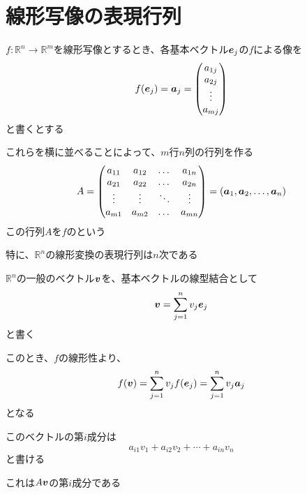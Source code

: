 \documentclass[b5paper,12pt]{jsarticle}
\begin{document}
\sectionline
\section{線形写像の表現行列}

$f\colon \mathbb{R}^n \to \mathbb{R}^m$を線形写像とするとき、各基本ベクトル$\vb*{e}_j$の$f$による像を
\begin{equation*}
  f(\vb*{e}_j) = \vb*{a}_j = \begin{pmatrix}
    a_{1j} \\
    a_{2j} \\
    \vdots \\
    a_{mj}
  \end{pmatrix}
\end{equation*}
と書くとする

これらを横に並べることによって、$m$行$n$列の行列を作る
\begin{equation*}
  A = \begin{pmatrix}
    a_{11} & a_{12} & \dots  & a_{1n} \\
    a_{21} & a_{22} & \dots  & a_{2n} \\
    \vdots & \vdots & \ddots & \vdots \\
    a_{m1} & a_{m2} & \dots  & a_{mn}
  \end{pmatrix} = (\vb*{a}_1, \vb*{a}_2, \dots, \vb*{a}_n)
\end{equation*}
この行列$A$を$f$のという

\br

特に、$\mathbb{R}^n$の線形変換の表現行列は$n$次である

\sectionline

$\mathbb{R}^n$の一般のベクトル$\vb*{v}$を、基本ベクトルの線型結合として
\begin{equation*}
  \vb*{v} = \sum_{j=1}^n v_j \vb*{e}_j
\end{equation*}
と書く

このとき、$f$の線形性より、
\begin{equation*}
  f(\vb*{v}) = \sum_{j=1}^n v_j f(\vb*{e}_j) = \sum_{j=1}^n v_j \vb*{a}_j
\end{equation*}
となる

このベクトルの第$i$成分は
\begin{equation*}
  a_{i1} v_1 + a_{i2} v_2 + \cdots + a_{in} v_n
\end{equation*}
と書ける

これは$A\vb*{v}$の第$i$成分である

\br
\end{document}
